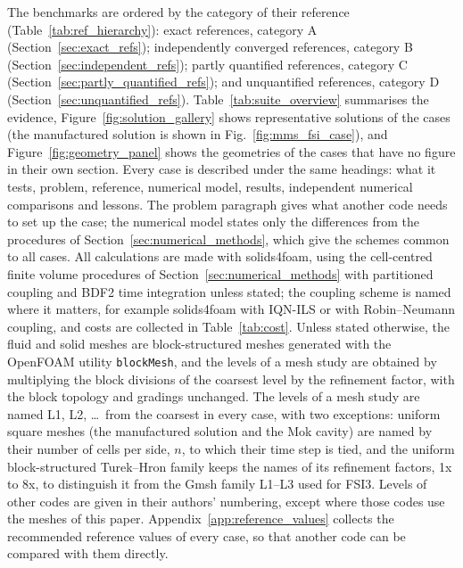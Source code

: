 The benchmarks are ordered by the category of their reference (Table~\ref{tab:ref_hierarchy}): exact references, category A (Section~\ref{sec:exact_refs}); independently converged references, category B (Section~\ref{sec:independent_refs}); partly quantified references, category C (Section~\ref{sec:partly_quantified_refs}); and unquantified references, category D (Section~\ref{sec:unquantified_refs}).
Table~\ref{tab:suite_overview} summarises the evidence, Figure~\ref{fig:solution_gallery} shows representative solutions of the cases (the manufactured solution is shown in Fig.~\ref{fig:mms_fsi_case}), and Figure~\ref{fig:geometry_panel} shows the geometries of the cases that have no figure in their own section.
Every case is described under the same headings: what it tests, problem, reference, numerical model, results, independent numerical comparisons and lessons.
The problem paragraph gives what another code needs to set up the case; the numerical model states only the differences from the procedures of Section~\ref{sec:numerical_methods}, which give the schemes common to all cases.
All calculations are made with solids4foam, using the cell-centred finite volume procedures of Section~\ref{sec:numerical_methods} with partitioned coupling and BDF2 time integration unless stated; the coupling scheme is named where it matters, for example solids4foam with IQN-ILS or with Robin--Neumann coupling, and costs are collected in Table~\ref{tab:cost}.
Unless stated otherwise, the fluid and solid meshes are block-structured meshes generated with the OpenFOAM utility \texttt{blockMesh}, and the levels of a mesh study are obtained by multiplying the block divisions of the coarsest level by the refinement factor, with the block topology and gradings unchanged.
The levels of a mesh study are named L1, L2, \dots\ from the coarsest in every case, with two exceptions: uniform square meshes (the manufactured solution and the Mok cavity) are named by their number of cells per side, $n$, to which their time step is tied, and the uniform block-structured Turek--Hron family keeps the names of its refinement factors, 1x to 8x, to distinguish it from the Gmsh family L1--L3 used for FSI3.
Levels of other codes are given in their authors' numbering, except where those codes use the meshes of this paper.
Appendix~\ref{app:reference_values} collects the recommended reference values of every case, so that another code can be compared with them directly.

